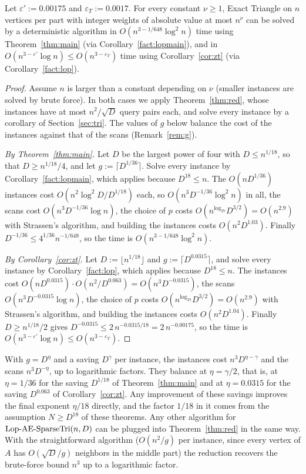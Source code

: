 \begin{theorem}\label{thm:zwt}
Let $\varepsilon':=0.00175$ and $\varepsilon_T:=0.0017$. For every constant $\nu\ge1$, Exact Triangle on $n$ vertices per part with integer weights of absolute value at most $n^\nu$ can be solved by a deterministic algorithm in $O(n^{3-1/648}\log^2n)$ time using Theorem~\ref{thm:main} (via Corollary~\ref{fact:lopmain}), and in $O(n^{3-\varepsilon'}\log n)\leq O(n^{3-\varepsilon_T})$ time using Corollary~\ref{cor:zt} (via Corollary~\ref{fact:lop}).
\end{theorem}
\begin{proof}
Assume $n$ is larger than a constant depending on $\nu$ (smaller instances are solved by brute force). In both cases we apply Theorem~\ref{thm:red}, whose instances have at most $n^2/\sqrt D$ query pairs each, and solve every instance by a corollary of Section~\ref{sec:tri}. The values of $g$ below balance the cost of the instances against that of the scans (Remark~\ref{rem:g}).

\emph{By Theorem~\ref{thm:main}.} Let $D$ be the largest power of four with $D\le n^{1/18}$, so that $D\ge n^{1/18}/4$, and let $g:=\lceil D^{1/36}\rceil$. Solve every instance by Corollary~\ref{fact:lopmain}, which applies because $D^{18}\le n$. The $O(nD^{1/36})$ instances cost $O(n^2\log^2\!D/D^{1/18})$ each, so $O(n^3D^{-1/36}\log^2n)$ in all, the scans cost $O(n^3D^{-1/36}\log n)$, the choice of $p$ costs $O(n^{\log_27}D^{3/2})=O(n^{2.9})$ with Strassen's algorithm, and building the instances costs $O(n^2D^{1.03})$. Finally $D^{-1/36}\le4^{1/36}n^{-1/648}$, so the time is $O(n^{3-1/648}\log^2n)$.

\emph{By Corollary~\ref{cor:zt}.} Let $D:=\lfloor n^{1/18}\rfloor$ and $g:=\lceil D^{0.0315}\rceil$, and solve every instance by Corollary~\ref{fact:lop}, which applies because $D^{18}\le n$. The instances cost $O(nD^{0.0315})\cdot O(n^2/D^{0.063})=O(n^3D^{-0.0315})$, the scans $O(n^3D^{-0.0315}\log n)$, the choice of $p$ costs $O(n^{\log_27}D^{3/2})=O(n^{2.9})$ with Strassen's algorithm, and building the instances costs $O(n^2D^{1.04})$. Finally $D\ge n^{1/18}/2$ gives $D^{-0.0315}\le2\,n^{-0.0315/18}=2\,n^{-0.00175}$, so the time is $O(n^{3-\varepsilon'}\log n)\leq O(n^{3-\varepsilon_T})$.
\end{proof}

\begin{remark}\label{rem:g}
With $g=D^\eta$ and a saving $D^{\gamma}$ per instance, the instances cost $n^3D^{\eta-\gamma}$ and the scans $n^3D^{-\eta}$, up to logarithmic factors. They balance at $\eta=\gamma/2$, that is, at $\eta=1/36$ for the saving $D^{1/18}$ of Theorem~\ref{thm:main} and at $\eta=0.0315$ for the saving $D^{0.063}$ of Corollary~\ref{cor:zt}. Any improvement of these savings improves the final exponent $\eta/18$ directly, and the factor $1/18$ in it comes from the assumption $N\ge D^{18}$ of these theorems. Any other algorithm for $\mathrm{Lop}\text{-}\mathrm{AE}\text{-}\mathrm{SparseTri}(n,D)$ can be plugged into Theorem~\ref{thm:red} in the same way. With the straightforward algorithm ($O(n^2/g)$ per instance, since every vertex of $A$ has $O(\sqrt D/g)$ neighbors in the middle part) the reduction recovers the brute-force bound $n^3$ up to a logarithmic factor.
\end{remark}

